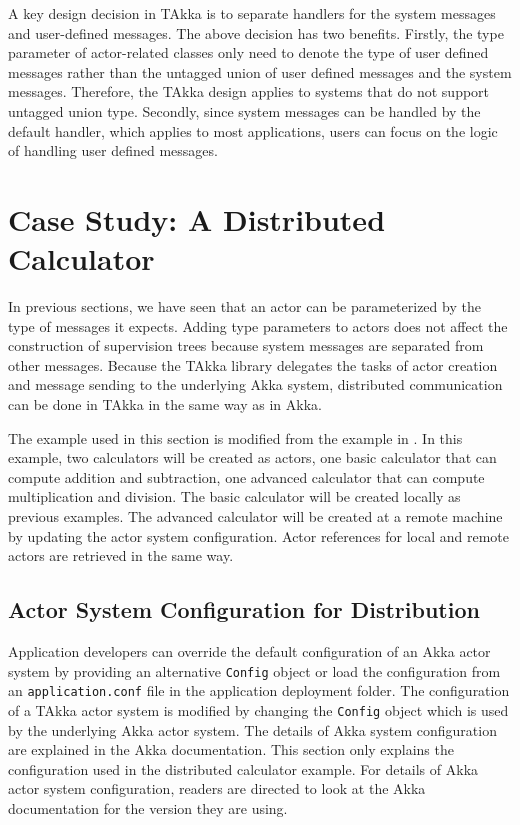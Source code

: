 A key design decision in TAkka is to separate handlers for the system messages 
and user-defined messages.  The above decision has two benefits. Firstly,
the type parameter of actor-related classes only need to denote
the type of user defined messages rather than the untagged union of user 
defined messages and the system messages.  Therefore, the TAkka design applies
to systems that do not support untagged union type.  Secondly, since 
system messages can be handled by the default handler, which applies
to most applications, users can focus on the logic of handling user
defined messages.







\section{Case Study: A Distributed Calculator}
\label{sec_distributed_calculator}

In previous sections, we have seen that an actor can be parameterized by the 
type of messages it expects.  Adding type parameters to actors does not affect 
the construction of supervision trees because system messages are separated 
from other messages.  Because the TAkka library delegates the tasks of actor 
creation and message sending to the underlying Akka system, distributed 
communication can be done in TAkka in the same way as in Akka.  

The example used in this section is modified from the example in \citep[Section 
5.11]{akka_doc}.  In this example, two calculators will be created as actors, 
one basic calculator that can compute addition and subtraction, one 
advanced calculator that can compute multiplication and division.  The basic 
calculator will be created locally as previous examples.  The advanced 
calculator will be created at a remote machine by updating the actor system 
configuration.  Actor references for local and remote actors are retrieved in 
the same way.


\subsection{Actor System Configuration for Distribution}

Application developers can override the default configuration of an Akka actor 
system by providing an alternative {\tt Config} object or load the 
configuration from an {\tt application.conf} file in the application deployment 
folder. \citep{akka_doc}  The configuration of a TAkka actor system is 
modified by changing the {\tt Config} object which is used by the underlying 
Akka actor system.  The details of Akka system configuration are explained in 
the Akka documentation.  This section only explains the configuration used in 
the distributed calculator example.  For details of Akka actor system 
configuration, readers are directed to look at the Akka documentation for the 
version they are using.

